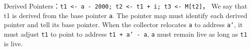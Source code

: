 \par \noindent Derived Pointers：\texttt{t1 <- a - 2000; t2 <- t1 + i; t3 <- M[t2]}，
We say that t1 is derived from the base pointer \texttt{a}. 
The pointer map must identify each derived pointer and tell its base pointer.
When the collector relocates \texttt{a} to address \texttt{a'}, it must adjust \texttt{t1} to point to address \texttt{t1 + a' - a},
\texttt{a} must remain live as long as \texttt{t1} is live.